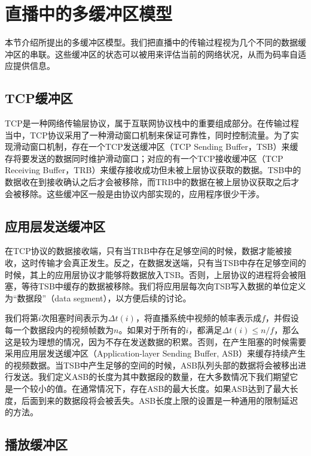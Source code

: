 \section{直播中的多缓冲区模型}

本节介绍所提出的多缓冲区模型。我们把直播中的传输过程视为几个不同的数据缓冲区的串联。这些缓冲区的状态可以被用来评估当前的网络状况，从而为码率自适应提供信息。

\subsection{TCP缓冲区}

TCP是一种网络传输层协议，属于互联网协议栈中的重要组成部分。在传输过程当中，TCP协议采用了一种滑动窗口机制来保证可靠性，同时控制流量。为了实现滑动窗口机制，存在一个TCP发送缓冲区（TCP Sending Buffer，TSB）来缓存将要发送的数据同时维护滑动窗口；对应的有一个TCP接收缓冲区（TCP Receiving Buffer，TRB）来缓存接收成功但未被上层协议获取的数据。TSB中的数据收在到接收确认之后才会被移除，而TRB中的数据在被上层协议获取之后才会被移除。这些缓冲区一般是由协议内部实现的，应用程序很少干涉。

\subsection{应用层发送缓冲区}

在TCP协议的数据接收端，只有当TRB中存在足够空间的时候，数据才能被接收，这时传输才会真正发生。反之，在数据发送端，只有当TSB中存在足够空间的时候，其上的应用层协议才能够将数据放入TSB。否则，上层协议的进程将会被阻塞，等待TSB中缓存的数据被移除。我们将应用层每次向TSB写入数据的单位定义为“数据段”（data segment），以方便后续的讨论。

我们将第$i$次阻塞时间表示为$\varDelta t(i)$，将直播系统中视频的帧率表示成$f$，并假设每一个数据段内的视频帧数为$n$。如果对于所有的$i$，都满足$\varDelta t(i) \le n/f$，那么这是较为理想的情况，因为不存在发送数据的积累。否则，在产生阻塞的时候需要采用应用层发送缓冲区（Application-layer Sending Buffer, ASB）来缓存持续产生的视频数据。当TSB中产生足够的空间的时候，ASB队列头部的数据将会被移出进行发送。我们定义ASB的长度为其中数据段的数量，在大多数情况下我们期望它是一个较小的值。在通常情况下，存在ASB的最大长度。如果ASB达到了最大长度，后面到来的数据段将会被丢失。ASB长度上限的设置是一种通用的限制延迟的方法。

\subsection{播放缓冲区}

